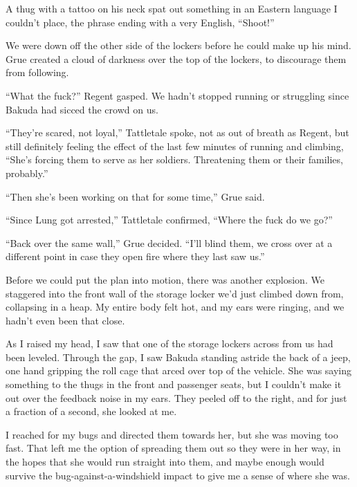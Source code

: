 A thug with a tattoo on his neck spat out something in an Eastern language I couldn't place, the phrase ending with a very English, ``Shoot!''



We were down off the other side of the lockers before he could make up his mind.  Grue created a cloud of darkness over the top of the lockers, to discourage them from following.



``What the fuck?'' Regent gasped.  We hadn't stopped running or struggling since Bakuda had sicced the crowd on us.



``They're scared, not loyal,'' Tattletale spoke, not as out of breath as Regent, but still definitely feeling the effect of the last few minutes of running and climbing, ``She's forcing them to serve as her soldiers.  Threatening them or their families, probably.''



``Then she's been working on that for some time,'' Grue said.



``Since Lung got arrested,'' Tattletale confirmed, ``Where the fuck do we go?''



``Back over the same wall,'' Grue decided.  ``I'll blind them, we cross over at a different point in case they open fire where they last saw us.''



Before we could put the plan into motion, there was another explosion. We staggered into the front wall of the storage locker we'd just climbed down from, collapsing in a heap.  My entire body felt hot, and my ears were ringing, and we hadn't even been that close.



As I raised my head, I saw that one of the storage lockers across from us had been leveled.  Through the gap, I saw Bakuda standing astride the back of a jeep, one hand gripping the roll cage that arced over top of the vehicle.  She was saying something to the thugs in the front and passenger seats, but I couldn't make it out over the feedback noise in my ears.  They peeled off to the right, and for just a fraction of a second, she looked at me.



I reached for my bugs and directed them towards her, but she was moving too fast.  That left me the option of spreading them out so they were in her way, in the hopes that she would run straight into them, and maybe enough would survive the bug-against-a-windshield impact to give me a sense of where she was.



